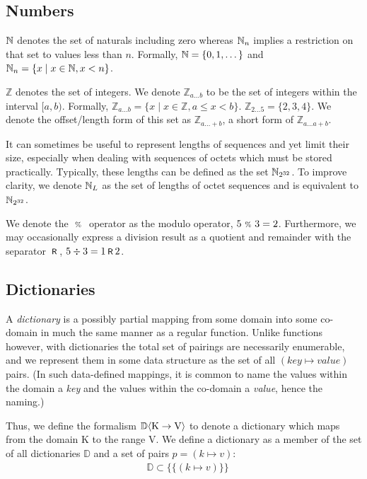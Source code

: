 \subsection{Numbers}\label{sec:numbers}

$\mathbb{N}$ denotes the set of naturals including zero whereas $\mathbb{N}_n$ implies a restriction on that set to values less than $n$. Formally, $\mathbb{N} = \{0, 1, \dots \}$ and $\mathbb{N}_n = \{ x \mid x \in \mathbb{N}, x < n \}$.

$\mathbb{Z}$ denotes the set of integers. We denote $\mathbb{Z}_{a \dots b}$ to be the set of integers within the interval $[a, b)$. Formally, $\mathbb{Z}_{a \dots b} = \{ x \mid x \in \mathbb{Z}, a \le x < b \}$. \Eg $\mathbb{Z}_{2 \dots 5} = \{ 2, 3, 4 \}$. We denote the offset/length form of this set as $\mathbb{Z}_{a \dots +b}$, a short form of $\mathbb{Z}_{a \dots a+b}$.

It can sometimes be useful to represent lengths of sequences and yet limit their size, especially when dealing with sequences of octets which must be stored practically. Typically, these lengths can be defined as the set $\mathbb{N}_{2^{32}}$. To improve clarity, we denote $\mathbb{N}_L$ as the set of lengths of octet sequences and is equivalent to $\mathbb{N}_{2^{32}}$.

We denote the $\ \text{\scriptsize{\%}}\ $ operator as the modulo operator, \eg $5 \ \text{\scriptsize{\%}}\  3 = 2$. Furthermore, we may occasionally express a division result as a quotient and remainder with the separator $\text{\hspace{2pt}\footnotesize{\textsf{R}}\hspace{2pt}}$, \eg $5 \div 3 = 1 \text{\hspace{2pt}\footnotesize{\textsf{R}}\hspace{2pt}} 2$.

\subsection{Dictionaries}\label{sec:dictionaries}

A \emph{dictionary} is a possibly partial mapping from some domain into some co-domain in much the same manner as a regular function. Unlike functions however, with dictionaries the total set of pairings are necessarily enumerable, and we represent them in some data structure as the set of all $(key \mapsto value)$ pairs. (In such data-defined mappings, it is common to name the values within the domain a \emph{key} and the values within the co-domain a \emph{value}, hence the naming.)

Thus, we define the formalism $\mathbb{D}\langle \mathrm{K}\to\mathrm{V}\rangle$ to denote a dictionary which maps from the domain $\mathrm{K}$ to the range $\mathrm{V}$. We define a dictionary as a member of the set of all dictionaries $\mathbb{D}$ and a set of pairs $p = (k \mapsto v)$:
\begin{align}
  &\mathbb{D} \subset \big \{ \{ (k \mapsto v) \} \big \}
\end{align}

